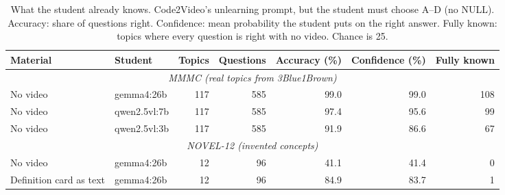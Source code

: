 \begin{table}[t]\centering\small
\caption{What the student already knows. Code2Video's unlearning prompt, but the student must choose A--D (no NULL). Accuracy: share of questions right. Confidence: mean probability the student puts on the right answer. Fully known: topics where every question is right with no video. Chance is 25.}\label{tab:priors}
\begin{tabular}{llrrrrr}\toprule Material & Student & Topics & Questions & Accuracy (\%) & Confidence (\%) & Fully known\\
\midrule
\multicolumn{7}{c}{\textit{MMMC (real topics from 3Blue1Brown)}}\\
No video & gemma4:26b & 117 & 585 & 99.0 & 99.0 & 108 \\
No video & qwen2.5vl:7b & 117 & 585 & 97.4 & 95.6 & 99 \\
No video & qwen2.5vl:3b & 117 & 585 & 91.9 & 86.6 & 67 \\
\midrule
\multicolumn{7}{c}{\textit{NOVEL-12 (invented concepts)}}\\
No video & gemma4:26b & 12 & 96 & 41.1 & 41.4 & 0 \\
Definition card as text & gemma4:26b & 12 & 96 & 84.9 & 83.7 & 1 \\
\bottomrule\end{tabular}
\end{table}
